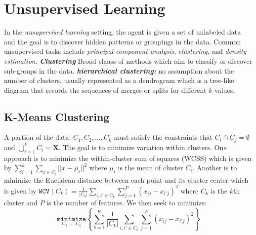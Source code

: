 \section{Unsupervised Learning}
In the \emph{unsupervised learning} setting, the agent is given a set of unlabeled data and the goal is to discover hidden patterns or groupings in the data. Common unsupervised tasks include \emph{principal component analysis}, \emph{clustering}, and \emph{density estimation}.
\emph\textbf{{Clustering}}
Broad claass of methods which aim to classify or discover sub-groups in the data.
\emph{\textbf{hierarchical clustering:}} no assumption about the number of clusters, usually represented as a dendrogram which is a tree-like diagram that records the sequences of merges or splits for different \(k\) values.

\subsection{K-Means Clustering}
A partion of the data: \(C_1,C_2,\dots,C_k\) must satisfy the constraints that \(C_i\cap C_j=\emptyset\) and \(\bigcup_{i=1}^{k}C_i=\mathbf{X}\). The goal is to minimize variation within clusters. One approach is to minimize the within-cluster sum of squares (WCSS) which is given by \(\sum_{i=1}^{k}\sum_{x\in C_i}||x-\mu_i||^2\) where \(\mu_i\) is the mean of cluster \(C_i\). Another is to minimize the Euclidean distance between each point and its cluster center which is given by \(\mathtt{WCV}(C_k)=\frac{1}{\vert C_k \vert}\sum_{i,i'\in C_k}\sum_{j=1}^P(x_{ij}-x_{i'j})^2\)  where \(C_k\) is the \(k\)th cluster and \(P\) is the number of features. We then seek to minimize:
\[
     \underset{C_1,\dots,C_k}{\mathtt{minimize}}\left\{\sum_{k=1}^{K}\frac{1}{|C_k|}\sum_{i,i'\in C_k}\sum_{j=1}^P(x_{ij}-x_{i'j})^2\right\}
\]

